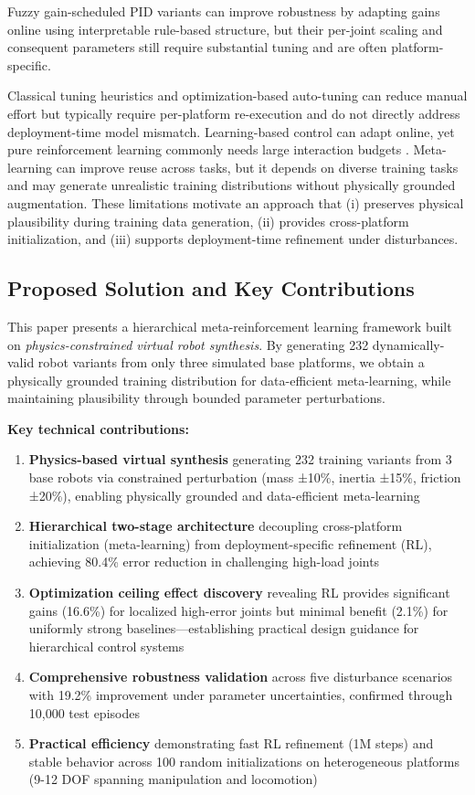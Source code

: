 \documentclass[a4paper]{cas-sc}
\begin{document}
Fuzzy gain-scheduled PID variants can improve robustness by adapting gains online using interpretable rule-based structure, but their per-joint scaling and consequent parameters still require substantial tuning and are often platform-specific.

Classical tuning heuristics and optimization-based auto-tuning \cite{gaing2004particle,berkenkamp2016safe} can reduce manual effort but typically require per-platform re-execution and do not directly address deployment-time model mismatch. Learning-based control can adapt online, yet pure reinforcement learning commonly needs large interaction budgets \cite{lillicrap2015continuous}. Meta-learning can improve reuse across tasks, but it depends on diverse training tasks and may generate unrealistic training distributions without physically grounded augmentation. These limitations motivate an approach that (i) preserves physical plausibility during training data generation, (ii) provides cross-platform initialization, and (iii) supports deployment-time refinement under disturbances.

\subsection{Proposed Solution and Key Contributions}

This paper presents a hierarchical meta-reinforcement learning framework built on \textit{physics-constrained virtual robot synthesis}. By generating 232 dynamically-valid robot variants from only three simulated base platforms, we obtain a physically grounded training distribution for data-efficient meta-learning, while maintaining plausibility through bounded parameter perturbations.

\textbf{Key technical contributions:}

\begin{enumerate}[leftmargin=*, itemsep=2pt]
    \item \textbf{Physics-based virtual synthesis} generating 232 training variants from 3 base robots via constrained perturbation (mass ±10\%, inertia ±15\%, friction ±20\%), enabling physically grounded and data-efficient meta-learning
    \item \textbf{Hierarchical two-stage architecture} decoupling cross-platform initialization (meta-learning) from deployment-specific refinement (RL), achieving 80.4\% error reduction in challenging high-load joints
    \item \textbf{Optimization ceiling effect discovery} revealing RL provides significant gains (16.6\%) for localized high-error joints but minimal benefit (2.1\%) for uniformly strong baselines—establishing practical design guidance for hierarchical control systems
    \item \textbf{Comprehensive robustness validation} across five disturbance scenarios with 19.2\% improvement under parameter uncertainties, confirmed through 10,000 test episodes
    \item \textbf{Practical efficiency} demonstrating fast RL refinement (1M steps) and stable behavior across 100 random initializations on heterogeneous platforms (9-12 DOF spanning manipulation and locomotion)
\end{enumerate}
\end{document}
